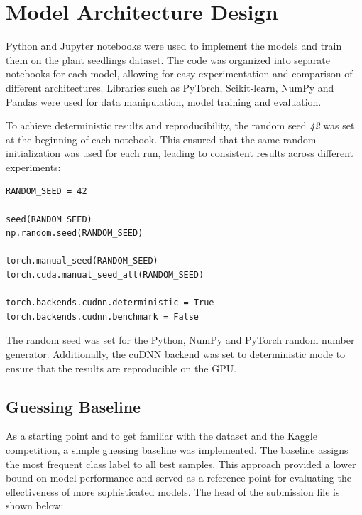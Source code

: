 \section{Model Architecture Design}

Python and Jupyter notebooks were used to implement the models and train them on the plant seedlings dataset. The code was organized into separate notebooks for each model, allowing for easy experimentation and comparison of different architectures. Libraries such as PyTorch, Scikit-learn, NumPy and Pandas were used for data manipulation, model training and evaluation.

To achieve deterministic results and reproducibility, the random seed \textit{42} was set at the beginning of each notebook. This ensured that the same random initialization was used for each run, leading to consistent results across different experiments:

\begin{minipage}{0.9\linewidth}\begin{lstlisting}[caption={Settings to achieve deterministic results and ensure reproducibility.},label={lst:deterministic-results}]
RANDOM_SEED = 42

seed(RANDOM_SEED)
np.random.seed(RANDOM_SEED)

torch.manual_seed(RANDOM_SEED)
torch.cuda.manual_seed_all(RANDOM_SEED)

torch.backends.cudnn.deterministic = True
torch.backends.cudnn.benchmark = False
\end{lstlisting}\end{minipage}

The random seed was set for the Python, NumPy and PyTorch random number generator. Additionally, the cuDNN backend was set to deterministic mode to ensure that the results are reproducible on the GPU.

\subsection{Guessing Baseline}

As a starting point and to get familiar with the dataset and the Kaggle competition, a simple guessing baseline was implemented. The baseline assigns the most frequent class label to all test samples. This approach provided a lower bound on model performance and served as a reference point for evaluating the effectiveness of more sophisticated models. The head of the submission file is shown below:

